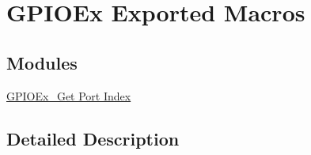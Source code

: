 \hypertarget{group___g_p_i_o_ex___exported___macros}{}\section{G\+P\+I\+O\+Ex Exported Macros}
\label{group___g_p_i_o_ex___exported___macros}
\subsection*{Modules}
\begin{DoxyCompactItemize}
\item 
\hyperlink{group___g_p_i_o_ex___get___port___index}{G\+P\+I\+O\+Ex\+\_\+\+Get Port Index}
\end{DoxyCompactItemize}


\subsection{Detailed Description}
